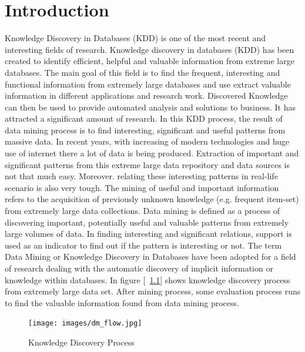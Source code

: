 %
\chapter{Introduction}
Knowledge Discovery in Databases (KDD) is one of the most recent and interesting fields of research. Knowledge discovery in databases (KDD) has been created to identify efficient, helpful and valuable information from extreme large databases. The main goal of this field is to find the frequent, interesting and functional information from extremely large databases and use extract valuable information in different applications and research work. Discovered Knowledge can then be used to provide automated analysis and solutions to business. It has attracted a significant amount of research. In this KDD process, the result of data mining process is to find interesting, significant and useful patterns from massive data. In recent years, with increasing of modern technologies and huge use of internet there a lot of data is being produced. Extraction of important and significant patterns from this extreme large data repository and data sources is not that much easy. Moreover. relating these interesting patterns in real-life scenario is also very tough. The mining of useful and important information refers to the acquisition of previously unknown knowledge (e.g. frequent item-set) from extremely large data collections. Data mining is defined as a process of discovering important, potentially useful and valuable patterns from extremely large volumes of data. In finding interesting and significant relations, support is used as an indicator to find out if the pattern is interesting or not. The term Data Mining or Knowledge Discovery in Databases have been adopted for a field of research dealing with the automatic discovery of implicit information or knowledge within databases. In figure [~\ref{figure:dm_flow}] shows knowledge discovery process from extremely large data set. After mining process, some evaluation process runs to find the valuable information found from data mining process.\\
\begin{figure}
\centering
  \texttt{[image: images/dm\_flow.jpg]}
\caption{Knowledge Discovery Process}
\label{figure:dm_flow}
\end{figure}
